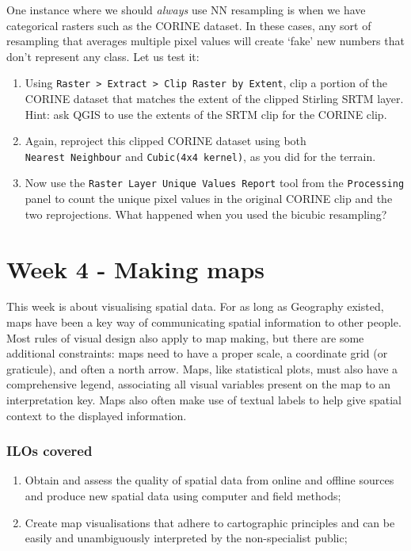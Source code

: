 \documentclass[
  letterpaper,
  DIV=11,
  numbers=noendperiod]{scrreprt}
\begin{document}
One instance where we should \emph{always} use NN resampling is when we
have categorical rasters such as the CORINE dataset. In these cases, any
sort of resampling that averages multiple pixel values will create
`fake' new numbers that don't represent any class. Let us test it:

\begin{enumerate}
\def\labelenumi{\arabic{enumi}.}
\setcounter{enumi}{5}
\item
  Using
  \texttt{Raster\ \textgreater{}\ Extract\ \textgreater{}\ Clip\ Raster\ by\ Extent},
  clip a portion of the CORINE dataset that matches the extent of the
  clipped Stirling SRTM layer. Hint: ask QGIS to use the extents of the
  SRTM clip for the CORINE clip.
\item
  Again, reproject this clipped CORINE dataset using both
  \texttt{Nearest\ Neighbour} and \texttt{Cubic(4x4\ kernel)}, as you
  did for the terrain.
\item
  Now use the \texttt{Raster\ Layer\ Unique\ Values\ Report} tool from
  the \texttt{Processing} panel to count the unique pixel values in the
  original CORINE clip and the two reprojections. What happened when you
  used the bicubic resampling?
\end{enumerate}

\part{Week 4 - Making maps}

This week is about visualising spatial data. For as long as Geography
existed, maps have been a key way of communicating spatial information
to other people. Most rules of visual design also apply to map making,
but there are some additional constraints: maps need to have a proper
scale, a coordinate grid (or graticule), and often a north arrow. Maps,
like statistical plots, must also have a comprehensive legend,
associating all visual variables present on the map to an interpretation
key. Maps also often make use of textual labels to help give spatial
context to the displayed information.

\section*{ILOs covered}\label{ilos-covered-3}


\begin{enumerate}
\def\labelenumi{\arabic{enumi}.}
\setcounter{enumi}{1}
\item
  Obtain and assess the quality of spatial data from online and offline
  sources and produce new spatial data using computer and field methods;
\item
  Create map visualisations that adhere to cartographic principles and
  can be easily and unambiguously interpreted by the non-specialist
  public;
\end{enumerate}
\end{document}
